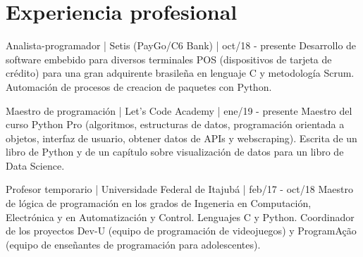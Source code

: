 \documentclass[espanol]{cv-style}          %
\begin{document}
\section{Experiencia profesional}
\vspace{-0.3cm}
\begin{entrylist}


\entry
{}
{Analista-programador | Setis (PayGo/C6 Bank) | oct/18 - presente}
{\vspace{-0.01cm}}
{Desarrollo de software embebido para diversos terminales POS (dispositivos de tarjeta de crédito) para una gran adquirente brasileña en lenguaje C y metodología Scrum. Automación de procesos de creacion de paquetes con Python.}
{}

\entry
  {}
  {Maestro de programación | Let's Code Academy | ene/19 - presente}
  {\vspace{-0.01cm}}
{Maestro del curso Python Pro (algoritmos, estructuras de datos, programación orientada a objetos, interfaz de usuario, obtener datos de APIs y webscraping). Escrita de un libro de Python y de un capítulo sobre visualización de datos para un libro de Data Science.}
 {} %

\entry
  {}
  {Profesor temporario | Universidade Federal de Itajubá | feb/17 - oct/18}
{\vspace{-0.01cm}}
{ Maestro de lógica de programación en los grados de Ingeneria en Computación, Electrónica y en Automatización y Control. Lenguajes C y Python. Coordinador de los proyectos Dev-U (equipo de programación de videojuegos) y ProgramAção (equipo de enseñantes de programación para adolescentes).}
\end{entrylist}
{\vspace{-0.4cm}}
\end{document}
